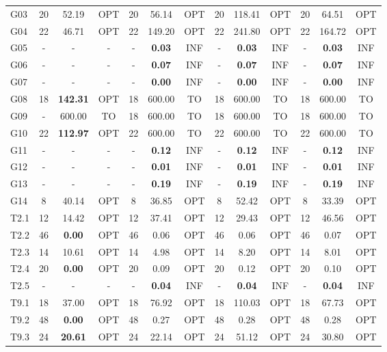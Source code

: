 \begin{table}[!htbp]
{\begin{tabular}{@{}l ccc ccc ccc ccc@{}}
G03 & 20 & 52.19 & OPT & 20 & 56.14 & OPT & 20 & 118.41 & OPT & 20 & 64.51 & OPT \\
G04 & 22 & 46.71 & OPT & 22 & 149.20 & OPT & 22 & 241.80 & OPT & 22 & 164.72 & OPT \\
G05 & - & - & - & - & \textbf{0.03} & INF & - & \textbf{0.03} & INF & - & \textbf{0.03} & INF \\
G06 & - & - & - & - & \textbf{0.07} & INF & - & \textbf{0.07} & INF & - & \textbf{0.07} & INF \\
G07 & - & - & - & - & \textbf{0.00} & INF & - & \textbf{0.00} & INF & - & \textbf{0.00} & INF \\
G08 & 18 & \textbf{142.31} & OPT & 18 & 600.00 & TO & 18 & 600.00 & TO & 18 & 600.00 & TO \\
G09 & - & 600.00 & TO & 18 & 600.00 & TO & 18 & 600.00 & TO & 18 & 600.00 & TO \\
G10 & 22 & \textbf{112.97} & OPT & 22 & 600.00 & TO & 22 & 600.00 & TO & 22 & 600.00 & TO \\
G11 & - & - & - & - & \textbf{0.12} & INF & - & \textbf{0.12} & INF & - & \textbf{0.12} & INF \\
G12 & - & - & - & - & \textbf{0.01} & INF & - & \textbf{0.01} & INF & - & \textbf{0.01} & INF \\
G13 & - & - & - & - & \textbf{0.19} & INF & - & \textbf{0.19} & INF & - & \textbf{0.19} & INF \\
G14 & 8 & 40.14 & OPT & 8 & 36.85 & OPT & 8 & 52.42 & OPT & 8 & 33.39 & OPT \\
T2.1 & 12 & 14.42 & OPT & 12 & 37.41 & OPT & 12 & 29.43 & OPT & 12 & 46.56 & OPT \\
T2.2 & 46 & \textbf{0.00} & OPT & 46 & 0.06 & OPT & 46 & 0.06 & OPT & 46 & 0.07 & OPT \\
T2.3 & 14 & 10.61 & OPT & 14 & 4.98 & OPT & 14 & 8.20 & OPT & 14 & 8.01 & OPT \\
T2.4 & 20 & \textbf{0.00} & OPT & 20 & 0.09 & OPT & 20 & 0.12 & OPT & 20 & 0.10 & OPT \\
T2.5 & - & - & - & - & \textbf{0.04} & INF & - & \textbf{0.04} & INF & - & \textbf{0.04} & INF \\
T9.1 & 18 & 37.00 & OPT & 18 & 76.92 & OPT & 18 & 110.03 & OPT & 18 & 67.73 & OPT \\
T9.2 & 48 & \textbf{0.00} & OPT & 48 & 0.27 & OPT & 48 & 0.28 & OPT & 48 & 0.28 & OPT \\
T9.3 & 24 & \textbf{20.61} & OPT & 24 & 22.14 & OPT & 24 & 51.12 & OPT & 24 & 30.80 & OPT \\

\end{tabular}}
\end{table}
